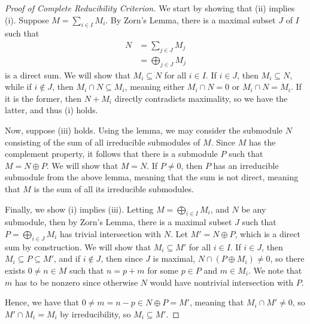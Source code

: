 \documentclass[10pt]{mypackage}
\begin{document}
\begin{proof}[Proof of Complete Reducibility Criterion]
  We start by showing that (ii) implies (i). Suppose $M = \sum_{i\in I}M_i$. By Zorn's Lemma, there is a maximal subset $J$ of $I$ such that
  \begin{align*}
    N &= \sum_{j\in J}M_j\\
      &= \bigoplus_{j\in J}M_j
  \end{align*}
  is a direct sum. We will show that $M_i\subseteq N$ for all $i\in I$. If $i\in J$, then $M_i\subseteq N$, while if $i\notin J$, then $M_i\cap N\subseteq M_i$, meaning either $M_i\cap N = 0$ or $M_i\cap N = M_i$. If it is the former, then $N + M_i$ directly contradicts maximality, so we have the latter, and thus (i) holds.

  Now, suppose (iii) holds. Using the lemma, we may consider the submodule $N$ consisting of the sum of all irreducible submodules of $M$. Since $M$ has the complement property, it follows that there is a submodule $P$ such that $M = N \oplus P$. We will show that $M = N$. If $P\neq 0$, then $P$ has an irreducible submodule from the above lemma, meaning that the sum is not direct, meaning that $M$ is the sum of all its irreducible submodules.

  Finally, we show (i) implies (iii). Letting $M = \bigoplus_{i\in I}M_i$, and $N$ be any submodule, then by Zorn's Lemma, there is a maximal subset $J$ such that $P = \bigoplus_{i\in J}M_i$ has trivial intersection with $N$. Let $M' = N\oplus P$, which is a direct sum by construction. We will show that $M_i\subseteq M'$ for all $i\in I$. If $i\in J$, then $M_i\subseteq P\subseteq M'$, and if $i\notin J$, then since $J$ is maximal, $N\cap \left( P\oplus M_i \right) \neq 0$, so there exists $0\neq n\in M$ such that $n = p + m$ for some $p\in P$ and $m\in M_i$. We note that $m$ has to be nonzero since otherwise $N$ would have nontrivial intersection with $P$.

  Hence, we have that $0\neq m = n-p \in N\oplus P = M'$, meaning that $M_i\cap M'\neq 0$, so $M'\cap M_i = M_i$ by irreducibility, so $M_i\subseteq M'$.
\end{proof}
\end{document}
